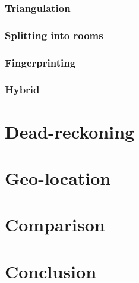 \documentclass[12pt,a4paper]{article}
\begin{document}
\subsubsection{Triangulation}
\subsubsection{Splitting into rooms}
\subsubsection{Fingerprinting}
\subsubsection{Hybrid}

\section{Dead-reckoning}
\section{Geo-location}

\section{Comparison}

\section{Conclusion}




\end{document}
